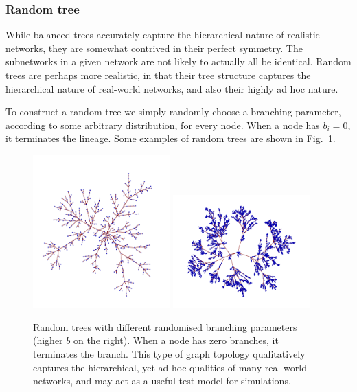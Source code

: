 %
%

\subsubsection{Random tree} 

While balanced trees accurately capture the hierarchical nature of realistic networks, they are somewhat contrived in their perfect symmetry. The subnetworks in a given network are not likely to actually all be identical. Random trees are perhaps more realistic, in that their tree structure captures the hierarchical nature of real-world networks, and also their highly ad hoc nature.

To construct a random tree we simply randomly choose a branching parameter, according to some arbitrary distribution, for every node. When a node has \mbox{$b_i=0$}, it terminates the lineage. Some examples of random trees are shown in Fig.~\ref{fig:random_tree}.

\begin{figure}[!htbp]
\includegraphics[width=0.47\textwidth]{random_tree_1}
\includegraphics[width=0.47\textwidth]{random_tree_2}
\caption{Random trees with different randomised branching parameters (higher $b$ on the right). When a node has zero branches, it terminates the branch. This type of graph topology qualitatively captures the hierarchical, yet ad hoc qualities of many real-world networks, and may act as a useful test model for simulations.} \label{fig:random_tree}
\end{figure}

